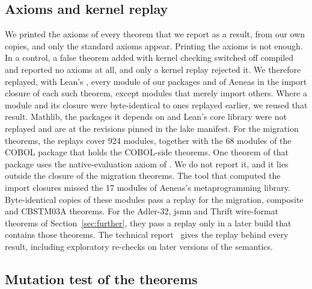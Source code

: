 \subsection{Axioms and kernel replay}

We printed the axioms of every theorem that we report as a result, from our own copies, and only the standard
axioms appear. Printing the
axioms is not enough. In a control, a false theorem added with kernel checking switched off compiled and reported no
axioms at all, and only a kernel replay rejected it. We therefore replayed, with Lean's , every module of our packages and of Aeneas in the import closure of each such theorem, except modules that merely
import others. Where a module and its closure were byte-identical to ones replayed earlier, we reused that result. Mathlib, the packages it
depends on and Lean's core library were not replayed and are at the revisions pinned in the lake manifest. For the migration theorems, the replays cover 924 modules, together with the 68 modules of the COBOL package that
holds the COBOL-side theorems. One theorem of that package uses the native-evaluation axiom of . We do not report it, and it lies
outside the closure of the migration theorems. The tool that computed the import closures missed the 17 modules of
Aeneas's metaprogramming library. Byte-identical copies of these modules pass a replay for the migration, composite
and CBSTM03A theorems. For the Adler-32, jsmn and Thrift wire-format theorems of Section~\ref{sec:further}, they pass a
replay only in a later build that contains those theorems. The technical report~\cite{fvtechreport} gives the replay behind every result, including
exploratory re-checks on later versions of the semantics.

\subsection{Mutation test of the theorems}

